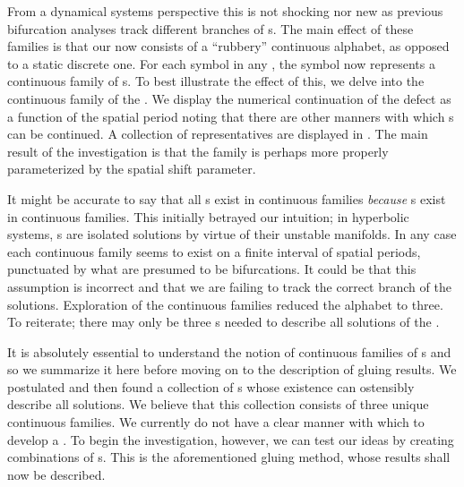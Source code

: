 
From a dynamical systems perspective
this is not shocking nor new as previous bifurcation analyses
track different branches of {\po}s.
The main effect of these families is that our {\symbolic}
now consists of a ``rubbery'' continuous alphabet, as opposed to a static discrete one.
For each symbol in any {\spt} {\brick}, the symbol now represents a continuous
family of {\fpo}s. To best illustrate the effect of this,
we delve into the continuous family of the {}.
We display the numerical continuation of the defect as a
function of the spatial period noting
that there are other manners with which {\po}s can be continued. A collection of representatives
are displayed in {}. The main result of the investigation is
that the family is perhaps more properly parameterized
by the spatial shift parameter.

It might be accurate to say that all {\po}s
exist in continuous families \emph{because} {\fpo}s exist in
continuous families. This initially betrayed our intuition; in hyperbolic systems, {\po}s are
isolated solutions by virtue of their unstable manifolds. In any case each continuous
family seems to exist on a finite interval of spatial periods, punctuated by what are
presumed to be bifurcations. It could be that this assumption is incorrect and that we
are failing to track the correct branch of the solutions.
Exploration of the {\fpo} continuous families reduced the alphabet
to three. To reiterate; there may only be three {\fpo}s
needed to describe all solutions of the {\KSe}.

It is absolutely essential to understand the notion of continuous families of {\fpo}s
and so we summarize it here before moving on to the description of gluing results. We postulated
and then found a collection of {\fpo}s whose existence can ostensibly describe all solutions.
We believe that this collection consists of three unique {\fpo} continuous families.
We currently do not have a clear manner with which to develop a {\spt} {\symbolic}.
To begin the investigation, however, we can test our ideas by creating
{\spt} combinations of {\fpo}s. This is the aforementioned gluing method,
whose results shall now be described.

